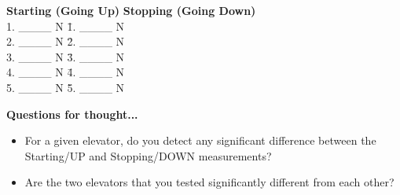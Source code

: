 \documentclass[12pt]{article}
\begin{document}
\vspace{0.5cm}

\begin{tabbing}
    \textbf{Starting (Going Up)} \hspace{2cm} \= \textbf{Stopping
    (Going Down)} \\
    1. \_\_\_\_ N \hspace{4cm} \= 1. \_\_\_\_ N \\
    2. \_\_\_\_ N \hspace{4cm} \= 2. \_\_\_\_ N \\
    3. \_\_\_\_ N \hspace{4cm} \= 3. \_\_\_\_ N \\
    4. \_\_\_\_ N \hspace{4cm} \= 4. \_\_\_\_ N \\
    5. \_\_\_\_ N \hspace{4cm} \= 5. \_\_\_\_ N \\
    \end{tabbing}
    
    \vspace{0.5cm}

\noindent \textbf{Questions for thought...}
\begin{itemize}
    \item For a given elevator, do you detect any significant difference between
    the Starting/UP and Stopping/DOWN measurements?
    \vspace{1.5cm}
    \item Are the two elevators that you tested significantly different from
    each other?
\end{itemize}
\end{document}
